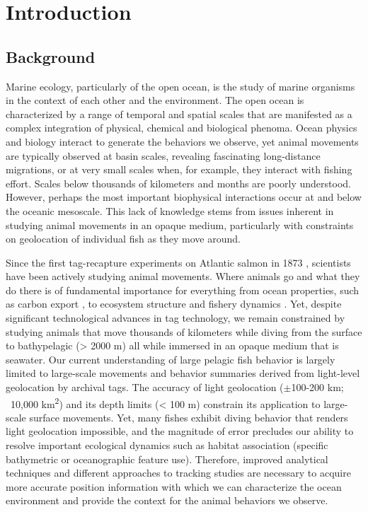 
\chapter{Introduction}
\raggedbottom
\clearpage


\section{Background}
Marine ecology, particularly of the open ocean, is the study of marine organisms in the context of each other and the environment. The open ocean is characterized by a range of temporal and spatial scales that are manifested as a complex integration of physical, chemical and biological phenoma. Ocean physics and biology interact to generate the behaviors we observe, yet animal movements are typically observed at basin scales, revealing fascinating long-distance migrations, or at very small scales when, for example, they interact with fishing effort. Scales below thousands of kilometers and months are poorly understood. However, perhaps the most important biophysical interactions occur at and below the oceanic mesoscale. This lack of knowledge stems from issues inherent in studying animal movements in an opaque medium, particularly with constraints on geolocation of individual fish as they move around. 

Since the first tag-recapture experiments on Atlantic salmon in 1873 \citep{Everhart1975}, scientists have been actively studying animal movements. Where animals go and what they do there is of fundamental importance for everything from ocean properties, such as carbon export \citep{Lavery2010a}, to ecosystem structure \citep{Thorrold2014} and fishery dynamics \citep{Block2005}. Yet, despite significant technological advances in tag technology, we remain constrained by studying animals that move thousands of kilometers while diving from the surface to bathypelagic (> 2000 m) all while immersed in an opaque medium that is seawater. Our current understanding of large pelagic fish behavior is largely limited to large-scale movements and behavior summaries derived from light-level geolocation by archival tags. The accuracy of light geolocation ($\pm$100-200 km; ~10,000 km\textsuperscript{2}) and its depth limits (< 100 m) constrain its application to large-scale surface movements. Yet, many fishes exhibit diving behavior that renders light geolocation impossible, and the magnitude of error precludes our ability to resolve important ecological dynamics such as habitat association (\eg specific bathymetric or oceanographic feature use). Therefore, improved analytical techniques and different approaches to tracking studies are necessary to acquire more accurate position information with which we can characterize the ocean environment and provide the context for the animal behaviors we observe.

